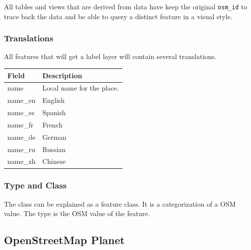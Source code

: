 All tables and views that are derived from \osm{} data have keep the original \texttt{osm\_id}
to trace back the data and be able to query a distinct \osm{} feature in a visual style.

\subsubsection{Translations}

All features that will get a label layer will contain several translations.

\begin{flushleft}
\begin{table}
    \begin{tabular}{ll}
    \hline
     Field    & 	Description                                    \\
    \hline
    name      & Local name for the place.  \\
    name\_en	 & English                          \\
    name\_es	 & Spanish                          \\
    name\_fr	 & French                           \\
    name\_de	 & German                           \\
    name\_ru	 & Russian                          \\
    name\_zh	 & Chinese                          \\
    \end{tabular}
\end{table}
\end{flushleft}


\subsubsection{Type and Class}

The class can be explained as a feature class. It is a categorization of a OSM value.
The type is the OSM value of the feature.


\subsection{OpenStreetMap Planet}

